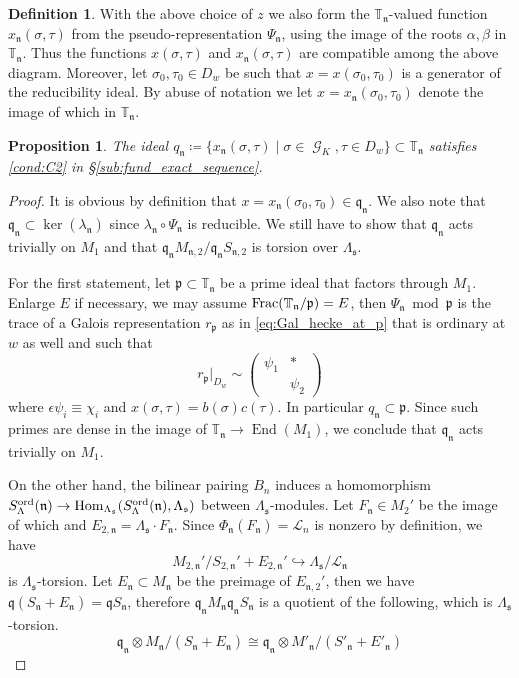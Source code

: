 \documentclass[leqno]{amsart}
\newtheorem{prop}[thm]{Proposition}
\theoremstyle{definition}
\newtheorem{defn}[thm]{Definition}
\theoremstyle{remark}
\newcommand{\smat}[1]{\left(\begin{smallmatrix} #1 \end{smallmatrix}\right)}
\DeclareMathOperator{\End}{End}
\DeclareMathOperator{\Hom}{Hom}
\DeclareMathOperator{\Gal}{\mathcal{G}}
\newcommand{\fn}{\mathfrak{n}}
\newcommand{\fp}{\mathfrak{p}}
\newcommand{\fq}{\mathfrak{q}}
\newcommand{\fs}{\mathfrak{s}}
\newcommand{\TT}{\mathbb{T}} %
\newcommand{\ord}{\textnormal{ord}} %
\begin{document}
\begin{defn}
With the above choice of $z$
we also form the $\TT_\fn$-valued
function  $x_\fn(\sigma,\tau)$ 
from the pseudo-representation $\Psi_\fn$,
using the image of the roots  $\alpha,\beta$ in  $\TT_\fn$.
Thus the functions $x(\sigma,\tau)$
and  $x_\fn(\sigma,\tau)$ are compatible 
among the above diagram.
Moreover,
let $\sigma_0,\tau_0\in D_w$
be such that $ x=x(\sigma_0,\tau_0)$
is a generator of the reducibility ideal.
By abuse of notation we let
$x=x_\fn(\sigma_0,\tau_0)$
denote the image of which in $\TT_\fn$.
\end{defn}

\begin{prop}

The ideal 
$q_{\fn}\coloneqq
\{x_\fn(\sigma,\tau)\mid\sigma\in\Gal_K, \tau\in D_w\}
\subset \TT_\fn$
satisfies \ref{cond:C2}
in \S\ref{sub:fund_exact_sequence}.

\end{prop}

\begin{proof}

It is obvious by definition
that $x=x_\fn(\sigma_0,\tau_0)\in \fq_\fn$.
We also note that 
$\fq_\fn\subset\ker(\lambda_\fn)$
since  $\lambda_\fn\circ\Psi_\fn$ is reducible.
We still have to show that
$\fq_\fn$ acts trivially on  $M_1$
and that 
$\fq_\fn M_{\fn,2}/\fq_\fn S_{\fn,2}$
is torsion over $\Lambda_{\fs}$.

For the first statement,
let $\fp\subset \TT_\fn$
be a prime ideal that 
factors through  $M_1$. 
Enlarge $E$ if necessary,
we may assume  $\textnormal{Frac}(\TT_\fn/\fp)=E$,
then  $\Psi_\fn\bmod \fp$
is the trace of a Galois representation  $r_{\fp}$
as in \eqref{eq:Gal_hecke_at_p}
that is ordinary at $w$ as well and such that
\[
	r_\fp\vert_{D_w}\sim
	\smat{\psi_1&*\\&\psi_2}
\]
where $\epsilon\psi_i\equiv \chi_i$
and $x(\sigma,\tau)=b(\sigma)c(\tau)$.
In particular $q_\fn\subset \fp$.
Since such primes are dense in the image
of $\TT_{\fn}\to \End(M_1)$,
we conclude that $\fq_{\fn}$ acts trivially on $M_1$.

On the other hand,
the bilinear pairing $B_n$ induces
a homomorphism 
$S^{\ord}_\Lambda(\fn)\to\Hom_{\Lambda_{\fs}}
(S^{\ord}_\Lambda(\fn),\Lambda_{\fs})$
between $\Lambda_{\fs}$-modules.
Let $F_\fn\in M_2'$ be the image of which
and $E_{2,\fn}=\Lambda_{\fs}\cdot F_\fn$.
Since  $\Phi_\fn(F_{\fn})=\mathcal{L}_n$ is nonzero 
by definition, we have
\[
	M_{2,\fn}'/S_{2,\fn}'+E_{2,\fn}'\hookrightarrow
	\Lambda_{\fs}/\mathcal{L}_{\fn}
\]
is $\Lambda_{\fs}$-torsion.
Let $E_{\fn}\subset M_{\fn}$ be the 
preimage of $E_{\fn,2}'$,
then we have $\fq(S_\fn+E_\fn)=\fq S_\fn$, 
therefore 
$\fq_{\fn}M_{\fn}\fq_{\fn}S_{\fn}$ is a quotient of
the following, which is $\Lambda_{\fs}$-torsion.
\[
	\fq_\fn\otimes 
	M_\fn/(S_\fn+E_\fn)\cong 
	\fq_{\fn}\otimes 
	M'_\fn/(S'_\fn+E'_\fn)
\]
\end{proof}
\end{document}
